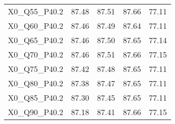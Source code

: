 \begin{table}[ht]
\begin{tabular}{rrrrr}
  X0\_Q55\_P40.2 & 87.48 & 87.51 & 87.66 & 77.11 \\ 
  X0\_Q60\_P40.2 & 87.46 & 87.49 & 87.64 & 77.11 \\ 
  X0\_Q65\_P40.2 & 87.46 & 87.50 & 87.65 & 77.14 \\ 
  X0\_Q70\_P40.2 & 87.46 & 87.51 & 87.66 & 77.15 \\ 
  X0\_Q75\_P40.2 & 87.42 & 87.48 & 87.65 & 77.11 \\ 
  X0\_Q80\_P40.2 & 87.38 & 87.47 & 87.65 & 77.11 \\ 
  X0\_Q85\_P40.2 & 87.30 & 87.45 & 87.65 & 77.11 \\ 
  X0\_Q90\_P40.2 & 87.18 & 87.41 & 87.66 & 77.15 \\ 
   \hline
\end{tabular}
\end{table}
